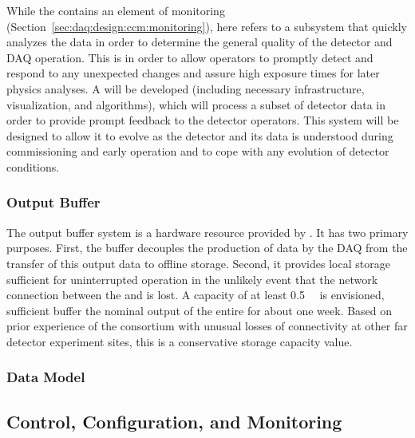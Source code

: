 While the  contains an element of monitoring (Section~\ref{sec:daq:design:ccm:monitoring}), here  refers to a subsystem that quickly analyzes the data in order to determine the general quality of the detector and DAQ operation.
This is in order to allow operators to promptly detect and respond to any unexpected changes and assure high exposure times for later physics analyses. 
A   
will be developed (including necessary infrastructure, visualization,
and algorithms), which will process a subset of detector data in order
to provide prompt feedback to the detector operators. 
This system will be designed to allow it to evolve as the detector and its data is understood during commissioning and early operation and to cope with any evolution of detector conditions.

\subsubsection{Output Buffer}

The output buffer system is a hardware resource provided by .
It has two primary purposes. 
First, the buffer decouples the production of data by the DAQ from the transfer of this output data to offline storage.
Second, it provides local storage sufficient for uninterrupted  operation in the unlikely event that the network connection between the  and \fnal is lost. 
A capacity of at least \SI{0.5}{\peta\byte} is envisioned,
sufficient buffer the nominal output of the entire  for about one week.
Based on prior experience
of the consortium with unusual losses of 
connectivity at other far detector experiment sites, this is a
conservative storage capacity value.

\subsubsection{Data Model}
\label{sec:fd-daq:design-data-model}




\subsection{Control, Configuration, and Monitoring}
\label{sec:fd-daq:design-run-control}

